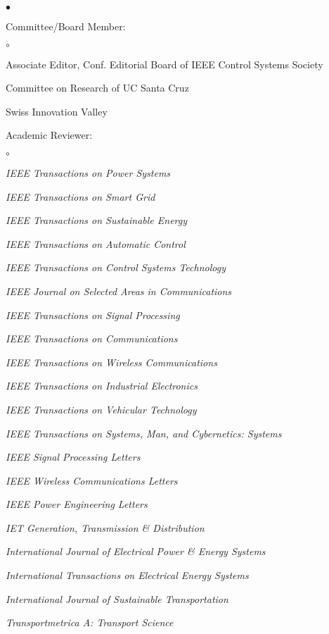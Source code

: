 \documentclass[margin,line]{res}
\newenvironment{list2}{
  \begin{list}{$\bullet$}{%
      \setlength{\itemsep}{0in}
      \setlength{\parsep}{0in} \setlength{\parskip}{0in}
      \setlength{\topsep}{0in} \setlength{\partopsep}{0in}
      \setlength{\leftmargin}{0.10in}}}{\end{list}}
\newenvironment{list3}{
  \begin{list}{$\circ$}{%
      \setlength{\itemsep}{0in}
      \setlength{\parsep}{0in} \setlength{\parskip}{0in}
      \setlength{\topsep}{0in} \setlength{\partopsep}{0in}
      \setlength{\leftmargin}{0.28in}}}{\end{list}}
\begin{document}
\begin{resume}
\begin{list2}
\item Committee/Board Member:
\begin{list3}
\item Associate Editor, Conf. Editorial Board of IEEE Control Systems Society
\item Committee on Research of UC Santa Cruz
\item Swiss Innovation Valley
\end{list3}
\vspace{4mm}

\item Academic Reviewer:
\begin{list3}
\item \emph{IEEE Transactions on Power Systems}
\item \emph{IEEE Transactions on Smart Grid}
\item \emph{IEEE Transactions on Sustainable Energy}
\item \emph{IEEE Transactions on Automatic Control}
\item \emph{IEEE Transactions on Control Systems Technology}
\item \emph{IEEE Journal on Selected Areas in Communications}
\item \emph{IEEE Transactions on Signal Processing}
\item \emph{IEEE Transactions on Communications}
\item \emph{IEEE Transactions on Wireless Communications}
\item \emph{IEEE Transactions on Industrial Electronics}
\item \emph{IEEE Transactions on Vehicular Technology}
\item \emph{IEEE Transactions on Systems, Man, and Cybernetics: Systems}
\item \emph{IEEE Signal Processing Letters}
\item \emph{IEEE Wireless Communications Letters}
\item \emph{IEEE Power Engineering Letters}
\item \emph{IET Generation, Transmission \& Distribution}
\item \emph{International Journal of Electrical Power \& Energy Systems}
\item \emph{International Transactions on Electrical Energy Systems}
\item \emph{International Journal of Sustainable Transportation}
\item \emph{Transportmetrica A: Transport Science}

\end{list3}
\end{list2}
\end{resume}
\end{document}
